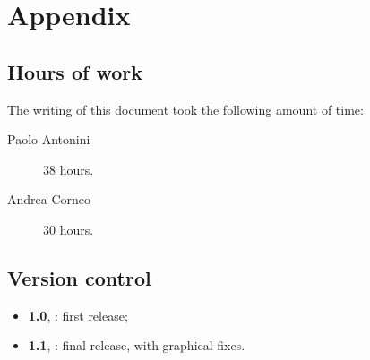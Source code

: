 \chapter{Appendix}\label{chap:appendix}

\section*{Hours of work}
The writing of this document took the following amount of time:

\begin{description}
	\item [Paolo Antonini] 38 hours.
	\item [Andrea Corneo] 30 hours.
\end{description}

\section*{Version control}
\begin{itemize}
	\item \textbf{1.0}, : first release;
	\item \textbf{1.1}, : final release, with graphical fixes.
\end{itemize}
